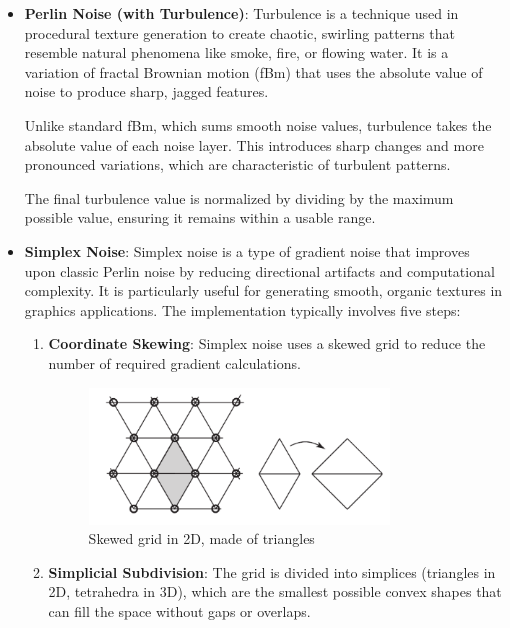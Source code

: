 \documentclass[12pt]{article}
\begin{document}
\begin{itemize}
    \item \textbf{Perlin Noise (with Turbulence)}:
    \newline
    Turbulence is a technique used in procedural texture generation to create chaotic, swirling patterns that resemble natural phenomena like smoke, fire, or flowing water. 
    It is a variation of fractal Brownian motion (fBm) that uses the absolute value of noise to produce sharp, jagged features.

    Unlike standard fBm, which sums smooth noise values, turbulence takes the absolute value of each noise layer. 
    This introduces sharp changes and more pronounced variations, which are characteristic of turbulent patterns.

    The final turbulence value is normalized by dividing by the maximum possible value, ensuring it remains within a usable range.

    \item \textbf{Simplex Noise}:
    \newline
    Simplex noise is a type of gradient noise that improves upon classic Perlin noise by reducing directional artifacts and computational complexity. 
    It is particularly useful for generating smooth, organic textures in graphics applications.
    The implementation typically involves five steps:
    \begin {enumerate}  
        \item \textbf{Coordinate Skewing}:
        \newline
        Simplex noise uses a skewed grid to reduce the number of required gradient calculations.

        \begin{figure}[H]
            \centering
            \includegraphics[width=0.8\textwidth]{Images/simplexGrid.png}
            \caption{Skewed grid in 2D, made of triangles}
        \end{figure}

        \item \textbf{Simplicial Subdivision}:
        \newline
        The grid is divided into simplices (triangles in 2D, tetrahedra in 3D), which are the smallest possible convex shapes that can fill the space without gaps or overlaps.


\end{enumerate}
\end{itemize}
\end{document}
